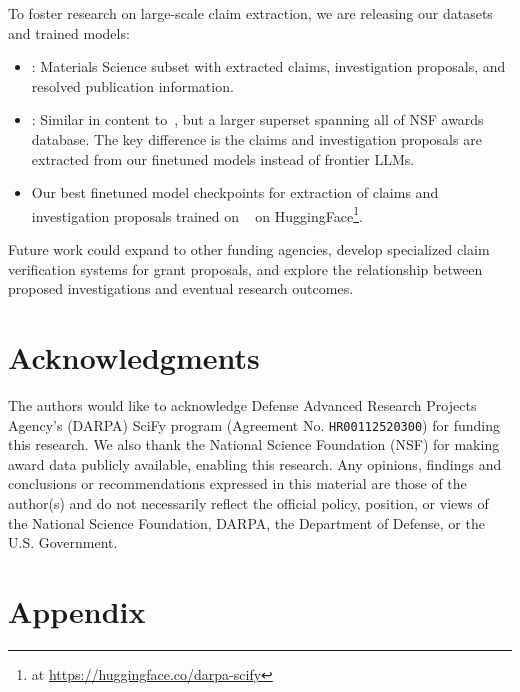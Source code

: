 \documentclass[11pt]{article}
\begin{document}
To foster research on large-scale claim extraction, we are releasing our datasets and trained models:
\begin{itemize}[noitemsep,topsep=0pt]
\item \DatasetNameMatSci: Materials Science subset with extracted claims, investigation proposals, and resolved publication information.
\item \DatasetName: Similar in content to~\DatasetNameMatSci, but a larger superset spanning all of NSF awards database. The key difference is the claims and investigation proposals are extracted from our finetuned models instead of frontier LLMs.
\item Our best finetuned model checkpoints for extraction of claims and investigation proposals trained on \DatasetNameMatSci~ on HuggingFace\footnote{at \url{https://huggingface.co/darpa-scify}}.
\end{itemize}

Future work could expand to other funding agencies, develop specialized claim verification systems for grant proposals, and explore the relationship between proposed investigations and eventual research outcomes.

\section*{Acknowledgments}
The authors would like to acknowledge Defense Advanced Research Projects Agency’s (DARPA) SciFy program (Agreement No. \texttt{HR00112520300}) for funding this research. We also thank the National Science Foundation (NSF) for making award data publicly available, enabling this research. Any opinions, findings and conclusions or recommendations expressed in this material are those of the author(s) and do not necessarily reflect the official policy, position, or views of the National Science Foundation, DARPA, the Department of Defense, or the U.S. Government.

%


\clearpage

\section*{Appendix}

\appendix
\end{document}
